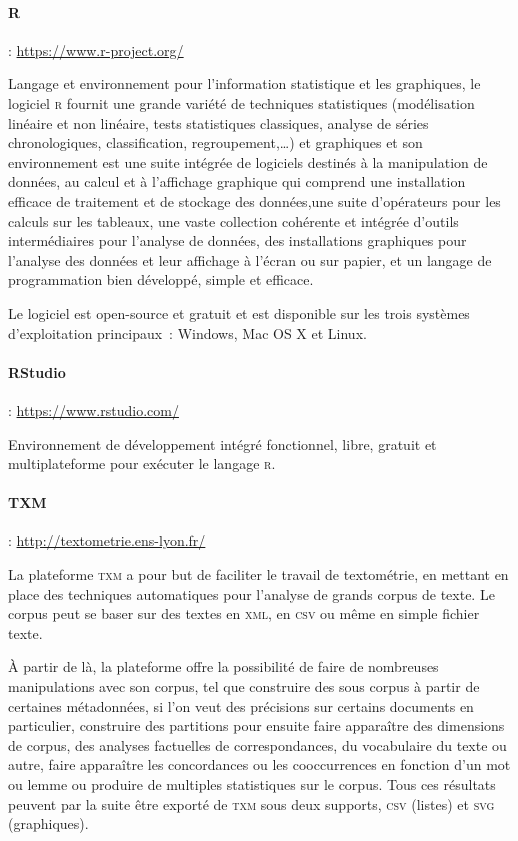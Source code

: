 \paragraph{R} : \url{https://www.r-project.org/}

Langage et environnement pour l'information statistique et les graphiques, le logiciel \textsc{r} fournit une grande variété de techniques statistiques (modélisation linéaire et non linéaire, tests statistiques classiques, analyse de séries chronologiques, classification, regroupement,…) et graphiques et son environnement est une suite intégrée de logiciels destinés à la manipulation de données, au calcul et à l'affichage graphique qui comprend une installation efficace de traitement et de stockage des données,une suite d'opérateurs pour les calculs sur les tableaux, une vaste collection cohérente et intégrée d'outils intermédiaires pour l'analyse de données, des installations graphiques pour l'analyse des données et leur affichage à l'écran ou sur papier, et un langage de programmation bien développé, simple et efficace.

Le logiciel est open-source et gratuit et est disponible sur les trois systèmes d'exploitation principaux~: Windows, Mac OS X et Linux.

\paragraph{RStudio} : \url{https://www.rstudio.com/}

Environnement de développement intégré fonctionnel, libre, gratuit et multiplateforme pour exécuter le langage \textsc{r}.

\paragraph{TXM} : \url{http://textometrie.ens-lyon.fr/} 

La plateforme \textsc{txm} a pour but de faciliter le travail de textométrie, en mettant en place des techniques automatiques pour l'analyse de grands corpus de texte. Le corpus peut se baser sur des textes en \textsc{xml}, en \textsc{csv} ou même en simple fichier texte.

À partir de là, la plateforme offre la possibilité de faire de nombreuses manipulations avec son corpus, tel que construire des sous corpus à partir de certaines métadonnées, si l'on veut des précisions sur certains documents en particulier, construire des partitions pour ensuite faire apparaître des dimensions de corpus, des analyses factuelles de correspondances, du vocabulaire du texte ou autre, faire apparaître les concordances ou les cooccurrences en fonction d'un mot ou lemme ou produire de multiples statistiques sur le corpus. Tous ces résultats peuvent par la suite être exporté de \textsc{txm} sous deux supports, \textsc{csv} (listes) et \textsc{svg} (graphiques).

